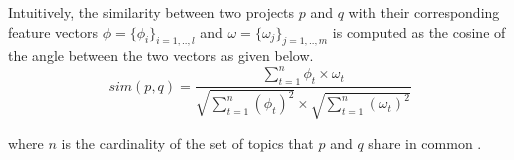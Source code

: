 Intuitively, the similarity between two projects $p$ and $q$ with their corresponding feature vectors $\phi=\{\phi_{i}\}_{i=1,..,l}$ and $\omega=\{\omega_{j}\}_{j=1,..,m}$ is computed as the cosine of the angle between the two vectors as given below. %
\begin{equation} \label{eqn:VsmSim}
sim(p,q)=\frac{\sum_{t=1}^{n}\phi_{t}\times \omega_{t}}{\sqrt{\sum_{t=1}^{n}(\phi_{t})^{2} }\times \sqrt{\sum_{t=1}^{n}(\omega_{t})^{2}}} 
\end{equation}

where $n$ is the cardinality of the set of topics that $p$ and $q$ share in common \cite{DiNoia:2012:LOD:2362499.2362501}. %







